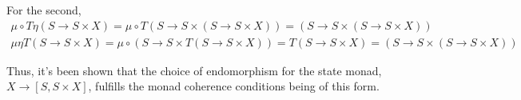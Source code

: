 \documentclass[10pt]{amsart}
\begin{document}
\begin{multicols*}{2}
For the second, 
\[
\begin{gathered}
\mu \circ T \eta (S\to S \times X) = \mu \circ T (S \to S \times (S \to S \times X)) = (S \to S \times (S \to S \times X)) \\
\mu \eta T (S\to S \times X) = \mu \circ (S \to S \times T(S \to S \times X)) = T(S \to S \times X) = (S \to S \times (S \to S \times X))
\end{gathered}
\]

\[
\]
Thus, it's been shown that the choice of endomorphism for the state monad, $X \to [S, S \times X]$, fulfills the monad coherence conditions being of this form.





\end{multicols*}
\end{document}
